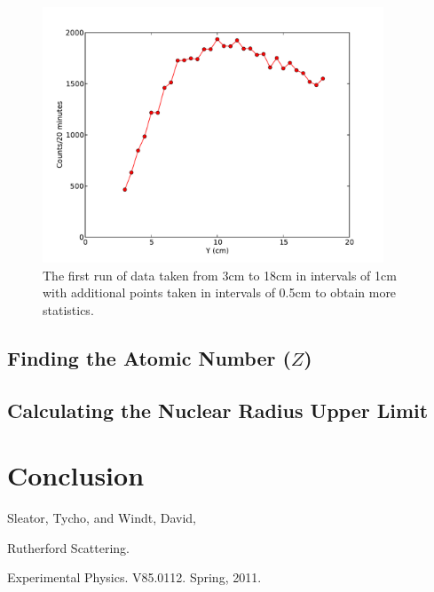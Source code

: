 \begin{figure}[h!]
\begin{center}
\includegraphics[width=4in]{secondrun.pdf}
\caption{The first run of data taken from 3cm to 18cm in intervals of 1cm with additional points taken in intervals of 0.5cm to obtain more statistics.}
\end{center}
\end{figure}
\subsection{Finding the Atomic Number ($Z$)}
\subsection{Calculating the Nuclear Radius Upper Limit}

\section{Conclusion}


\begin{thebibliography}{99}
Sleator, Tycho, and Windt, David, \begin{em}Rutherford Scattering. \end{em}Experimental Physics. V85.0112. Spring, 2011.
\end{thebibliography}

